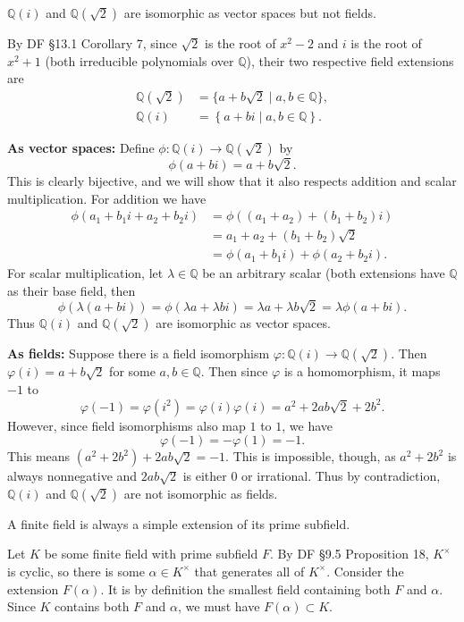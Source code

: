 \documentclass[10pt]{report}
\begin{document}

\begin{exer}[]
	$\mathbb{Q}(i)$ and $\mathbb{Q}(\sqrt{2} )$ are isomorphic as vector spaces but not fields.
\end{exer}
By DF \S 13.1 Corollary 7, since $\sqrt{2} $ is the root of $x^2-2$ and $i$ is the root of $x^2+1$ (both irreducible polynomials over $\mathbb{Q}$), their two respective field extensions are
\begin{align*}
	\mathbb{Q}(\sqrt{2} ) &= \{ a + b \sqrt{2} \;|\; a,b \in \mathbb{Q} \}, \\
	\mathbb{Q}(i ) &= \left\{ a + b i \;|\; a,b \in \mathbb{Q} \right\}.
\end{align*}

\textbf{As vector spaces:} Define $\phi:\mathbb{Q}(i)\to \mathbb{Q}(\sqrt{2} )$ by
\[
	\phi(a+bi) = a+b\sqrt{2} .
\] This is clearly bijective, and we will show that it also respects addition and scalar multiplication. For addition we have
\begin{align*}
	\phi(a_1+b_1 i + a_2+b_2 i) &= \phi( (a_1+a_2) + (b_1+b_2)i) \\
				    &= a_1+a_2+(b_1+b_2)\sqrt{2} \\
				    &= \phi(a_1+b_1i)+\phi(a_2+b_2i).
\end{align*}
For scalar multiplication, let $\lambda \in \mathbb{Q}$ be an arbitrary scalar (both extensions have $\mathbb{Q}$ as their base field, then
\[
	\phi(\lambda(a+bi)) = \phi(\lambda a + \lambda b i) = \lambda a + \lambda b \sqrt{2} = \lambda \phi(a+bi).
\]
Thus $\mathbb{Q}(i)$ and $\mathbb{Q}(\sqrt{2} )$ are isomorphic as vector spaces.

\textbf{As fields:} Suppose there is a field isomorphism $\varphi:\mathbb{Q}(i)\to \mathbb{Q}(\sqrt{2} )$. Then $\varphi(i)=a+b\sqrt{2} $ for some $a,b \in \mathbb{Q}$. Then since $\varphi$ is a homomorphism, it maps $-1$ to
\[
	\varphi(-1) = \varphi(i^2) = \varphi(i)\varphi(i) = a^2+2ab\sqrt{2} +2b^2.
\] However, since field isomorphisms also map $1$ to $1$, we have
\[
	\varphi(-1) = -\varphi(1) = -1.
\] This means $(a^2+2b^2)+2ab\sqrt{2} =-1$. This is impossible, though, as $a^2+2b^2$ is always nonnegative and $2ab \sqrt{2} $ is either 0 or irrational. Thus by contradiction, $\mathbb{Q}(i)$ and $\mathbb{Q}(\sqrt{2} )$ are not isomorphic as fields.
\newpage

\begin{exer}[]
	A finite field is always a simple extension of its prime subfield.
\end{exer}
Let $K$ be some finite field with prime subfield $F$. By DF \S 9.5 Proposition 18, $K^{\times}$ is cyclic, so there is some $\alpha \in K^{\times}$ that generates all of $K^{\times}$. Consider the extension $F(\alpha)$. It is by definition the smallest field containing both $F$ and $\alpha$. Since $K$ contains both $F$ and $\alpha$, we must have $F(\alpha)\subset K$.
\end{document}
